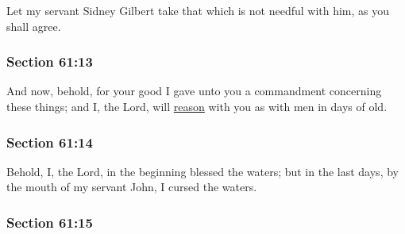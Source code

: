 		Let my servant Sidney Gilbert take that which is not needful with him, as you shall agree.


	\subsubsection{Section 61:13} %
		\label{DC61-13}

		And now, behold, for your good I gave unto you a commandment concerning these things; and I, the Lord, will \hyperref[REASON]{reason} with you as with men in days of old.


	\subsubsection{Section 61:14} %
		\label{DC61-14}

		Behold, I, the Lord, in the beginning blessed the waters; but in the last days, by the mouth of my servant John, I cursed the waters.


	\subsubsection{Section 61:15} %
		\label{DC61-15}

